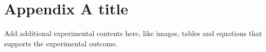\section{Appendix A title} \label{section: appendix A title}
Add additional experimental contents here, like images, tables and equations that supports the experimental outcome.